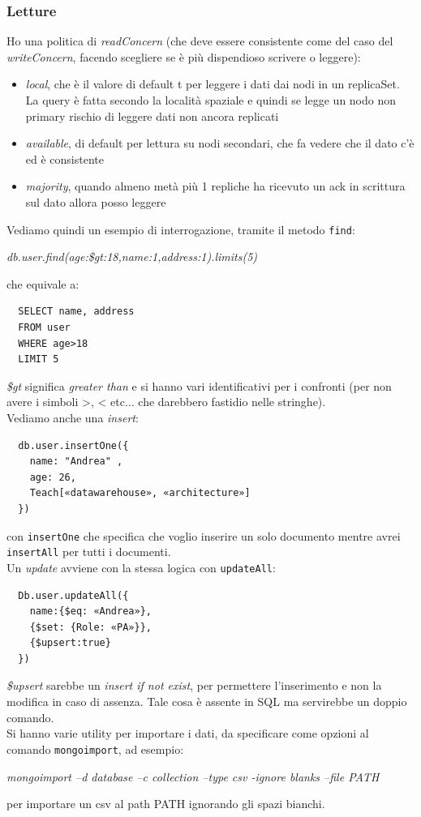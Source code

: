 \documentclass[a4paper,12pt, oneside]{book}
\begin{document}
\subsubsection{Letture}
Ho una politica di \textit{readConcern} (che deve essere consistente come del
caso del \textit{writeConcern}, facendo scegliere se è più dispendioso scrivere
o leggere):
\begin{itemize}
  \item \textit{local}, che è il valore di default t per leggere i dati dai nodi
  in un replicaSet. La query è fatta secondo la località spaziale e quindi se
  legge un nodo non primary rischio di leggere dati non ancora replicati
  \item \textit{available}, di default per lettura su nodi secondari, che fa
  vedere che il dato c'è ed è consistente
  \item \textit{majority}, quando almeno metà più 1 repliche ha ricevuto un ack
  in scrittura sul dato allora posso leggere
\end{itemize}
Vediamo quindi un esempio di interrogazione, tramite il metodo \texttt{find}:
\begin{center}
  \textit{db.user.find({age:{\$gt:18}},{name:1,address:1}).limits(5)}
\end{center}
che equivale a:
\begin{verbatim}
  SELECT name, address
  FROM user
  WHERE age>18
  LIMIT 5
\end{verbatim}
\textit{\$gt} significa \textit{greater than} e si hanno vari identificativi per
i confronti (per non avere i simboli >, < etc$\ldots$ che darebbero fastidio
nelle stringhe).\\
Vediamo anche una \textit{insert}:
\begin{verbatim}
  db.user.insertOne({
    name: "Andrea" ,
    age: 26,
    Teach[«datawarehouse», «architecture»]
  })
\end{verbatim}
con \texttt{insertOne} che specifica che voglio inserire un solo documento
mentre avrei \texttt{insertAll} per tutti i documenti.\\
Un \textit{update} avviene con la stessa logica con \texttt{updateAll}:
\begin{verbatim}
  Db.user.updateAll({
    name:{$eq: «Andrea»},
    {$set: {Role: «PA»}},
    {$upsert:true}
  })
\end{verbatim}
\textit{\$upsert} sarebbe un \textit{insert if not exist}, per permettere
l'inserimento e non la modifica in caso di assenza. Tale cosa è assente in SQL
ma servirebbe un doppio comando.\\
Si hanno varie utility per importare i dati, da specificare come opzioni al
comando \texttt{mongoimport}, ad esempio:
\begin{center}
  \textit{mongoimport –d database –c collection –type csv -ignore blanks –file
    PATH} 
\end{center}
per importare un csv al path PATH ignorando gli spazi bianchi.\\
\end{document}
